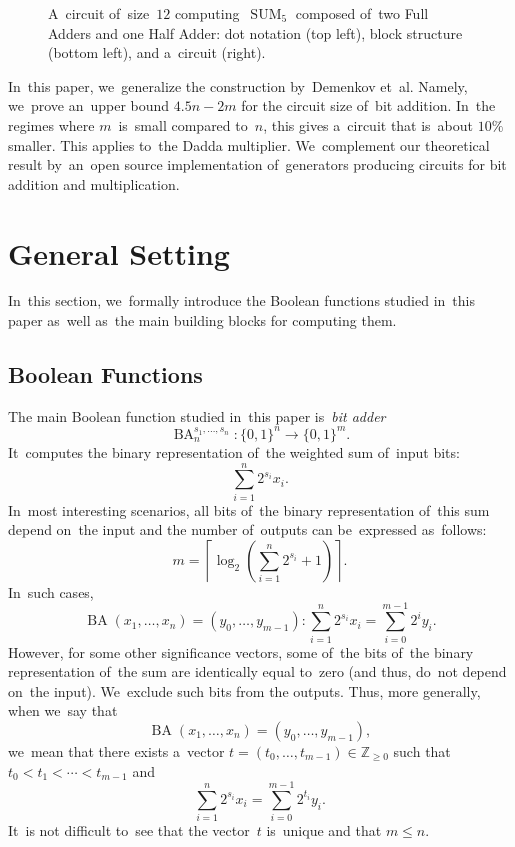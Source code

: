 \documentclass[a4paper, UKenglish, cleveref, autoref,  thm-restate]{lipics-v2021}
\DeclareMathOperator{\SUM}{SUM}
\DeclareMathOperator{\BA}{BA}
\begin{document}
\begin{figure}[ht]
\begin{center}
        \end{center}
        \caption{A~circuit of~size~$12$ computing~$\SUM_5$ composed of~two Full Adders and one Half Adder: dot notation (top left), block structure (bottom left), and a~circuit (right).}
        \label{figure:sumfive}
    \end{figure}


    In~this paper, we~generalize the construction by~Demenkov et~al.
    Namely, we~prove an~upper bound $4.5n-2m$
    for the circuit size of~bit addition.
    In~the regimes where $m$~is~small
    compared to~$n$, this gives a~circuit that is~about $10\%$ smaller.
    This applies to~the Dadda multiplier.
    We~complement our theoretical result by~an~open source implementation
    of~generators producing circuits for bit addition and multiplication.

    \section{General Setting}
    In~this section,
    we~formally introduce the Boolean functions
    studied in~this paper as~well as~the main building blocks
    for computing them.

    \subsection{Boolean Functions}
    The main Boolean function studied in~this paper
    is~\emph{bit adder}
    \[\BA_n^{s_1, \dotsc, s_n} \colon \{0,1\}^n \to \{0,1\}^m.\]
    It~computes the binary representation of~the weighted sum of~input bits:
    \[\sum_{i=1}^{n}2^{s_i}x_i.\]
    \color{red}
    In~most interesting scenarios, all bits of~the binary representation of~this sum depend on~the input and the number of~outputs can
    be~expressed as~follows:
    \[m=\left\lceil \log_2\left( \sum_{i=1}^{n}2^{s_i} + 1\right) \right\rceil.\]
    In~such cases,
    \[\BA(x_1, \dotsc, x_n)=(y_0, \dotsc, y_{m-1}) \colon \sum_{i=1}^{n}2^{s_i}x_i=\sum_{i=0}^{m-1}2^iy_i.\]
    However, for some other significance vectors, some of~the bits
    of~the binary representation of~the sum are identically equal to~zero (and thus, do~not depend on~the input). We~exclude such bits from the outputs. Thus, more generally, when we~say that
    \[\BA(x_1, \dotsc, x_n)=(y_0, \dotsc, y_{m-1}),\]
    we~mean that there exists a~vector $t=(t_0, \dotsc, t_{m-1}) \in \mathbb{Z}_{\ge 0}$ such that $t_0 < t_1 < \dotsb < t_{m-1}$ and
    \[\sum_{i=1}^{n}2^{s_i}x_i=\sum_{i=0}^{m-1}2^{t_i}y_i.\]
    It~is not difficult to~see that the vector~$t$ is~unique and that $m \le n$.
\end{document}
